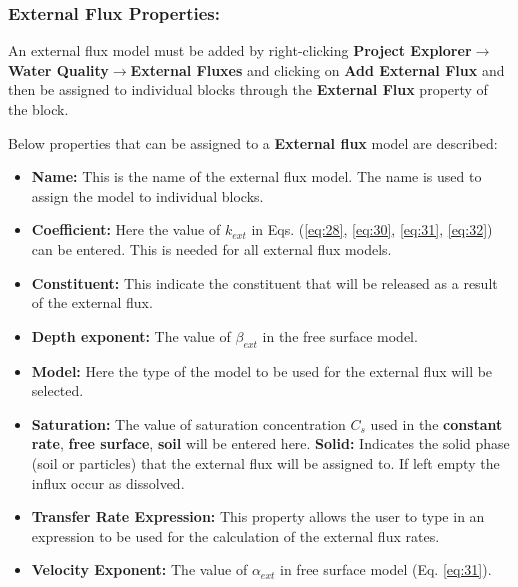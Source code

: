 \subsubsection{External Flux Properties: }
An external flux model must be added by right-clicking \textbf{Project Explorer}$\rightarrow$\textbf{Water Quality}$\rightarrow$\textbf{External Fluxes} and clicking on \textbf{Add External Flux} and then be assigned to individual blocks through the \textbf{External Flux} property of the block. 

Below properties that can be assigned to a \textbf{External flux} model are described: 

\begin{itemize}
\item \textbf{Name: } This is the name of the external flux model. The name is used to assign the model to individual blocks. 
\item \textbf{Coefficient: } Here the value of $k_{ext}$ in Eqs. (\ref{eq:28}, \ref{eq:30}, \ref{eq:31}, \ref{eq:32}) can be entered. This is needed for all external flux models. 
\item \textbf{Constituent: } This indicate the constituent that will be released as a result of the external flux. 
\item \textbf{Depth exponent: } The value of $\beta_{ext}$ in the free surface model. 
\item \textbf{Model: } Here the type of the model to be used for the external flux will be selected. 
\item \textbf{Saturation: } The value of saturation concentration $C_s$ used in the \textbf{constant rate}, \textbf{free surface}, \textbf{soil} will be entered here. 
\textbf{Solid: } Indicates the solid phase (soil or particles) that the external flux will be assigned to. If left empty the influx occur as dissolved. 
\item \textbf{Transfer Rate Expression: } This property allows the user to type in an expression to be used for the calculation of the external flux rates. 
\item \textbf{Velocity Exponent: } The value of $\alpha_{ext}$ in free surface model (Eq. \ref{eq:31}). 
\end{itemize}

